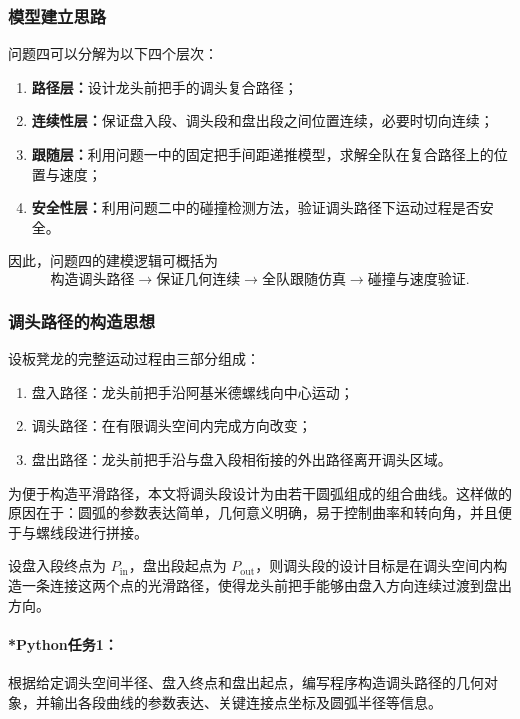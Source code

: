 \documentclass[12pt,a4paper]{ctexart}
\begin{document}
\subsubsection{模型建立思路}
问题四可以分解为以下四个层次：

\begin{enumerate}
    \item \textbf{路径层：}设计龙头前把手的调头复合路径；
    \item \textbf{连续性层：}保证盘入段、调头段和盘出段之间位置连续，必要时切向连续；
    \item \textbf{跟随层：}利用问题一中的固定把手间距递推模型，求解全队在复合路径上的位置与速度；
    \item \textbf{安全性层：}利用问题二中的碰撞检测方法，验证调头路径下运动过程是否安全。
\end{enumerate}

因此，问题四的建模逻辑可概括为
\[
\text{构造调头路径} \longrightarrow \text{保证几何连续} \longrightarrow \text{全队跟随仿真} \longrightarrow \text{碰撞与速度验证}.
\]

\subsubsection{调头路径的构造思想}
设板凳龙的完整运动过程由三部分组成：

\begin{enumerate}
    \item 盘入路径：龙头前把手沿阿基米德螺线向中心运动；
    \item 调头路径：在有限调头空间内完成方向改变；
    \item 盘出路径：龙头前把手沿与盘入段相衔接的外出路径离开调头区域。
\end{enumerate}

为便于构造平滑路径，本文将调头段设计为由若干圆弧组成的组合曲线。这样做的原因在于：圆弧的参数表达简单，几何意义明确，易于控制曲率和转向角，并且便于与螺线段进行拼接。

设盘入段终点为 $P_{\mathrm{in}}$，盘出段起点为 $P_{\mathrm{out}}$，则调头段的设计目标是在调头空间内构造一条连接这两个点的光滑路径，使得龙头前把手能够由盘入方向连续过渡到盘出方向。

\paragraph{*Python任务1：}
根据给定调头空间半径、盘入终点和盘出起点，编写程序构造调头路径的几何对象，并输出各段曲线的参数表达、关键连接点坐标及圆弧半径等信息。
\end{document}
